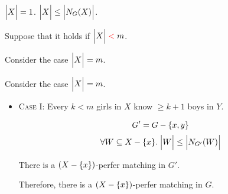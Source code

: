 \begin{frame}{}
  \begin{center}

    \pause
    \vspace{0.30cm}
    \begin{description}
      \setlength{\itemsep}{8pt}
      \item[Basis Step:] $\Big\lvert X \Big\rvert = 1$. $\Big\lvert X \Big\rvert \le \Big\lvert N_{G}(X) \Big\rvert$.
      \item[Induction Hypothesis:]
        Suppose that it holds if $\Big\lvert X \Big\rvert \;\textcolor{red}{<}\; m$.
      \item[Induction Step:]
        Consider the case $\Big\lvert X \Big\rvert = m$.
    \end{description}
  \end{center}
\end{frame}

\begin{frame}{}
  \begin{center}
    Consider the case $\Big\lvert X \Big\rvert = m$.

    \pause
    \vspace{0.50cm}
    \begin{itemize}
      \item \textsc{Case I:} Every $k < m$ girls in $X$ know
        $\ge k + 1$ boys in $Y$.

        \pause
        \vspace{0.20cm}
        \begin{center}
          \pause
          \[
            G' = G - \{x, y\}
          \]
          \pause
          \pause
          \[
            \forall W \subseteq X - \{x\}.\; \Big\lvert W \Big\rvert \le \Big\lvert N_{G'}(W) \Big\rvert
          \]

          \pause
          There is a $(X - \{x\})$-perfer matching in $G'$.

          \pause
          \vspace{0.30cm}
          Therefore, there is a $(X - \{x\})$-perfer matching in $G$.
        \end{center}
    \end{itemize}
  \end{center}
\end{frame}

